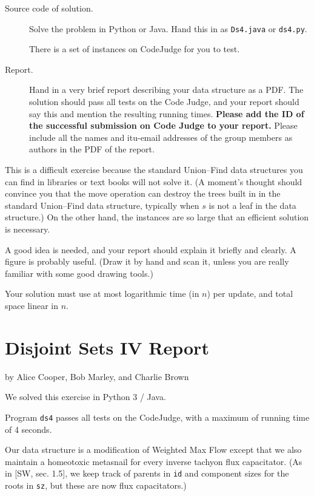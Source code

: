 \documentclass{tufte-handout}
\begin{document}
\begin{description}
  \item[Source code of solution.]
    Solve the problem in Python or Java.
    Hand this in as \texttt{Ds4.java} or \texttt{ds4.py}.

    There is a set of instances on CodeJudge for you to test.
  \item[Report.]
    Hand in a very brief report describing your data structure as a PDF. 
    The solution should pass all tests on the Code Judge, and your report should say this and mention the resulting running times.
    \textbf{Please add the ID of the successful submission on Code Judge to your report.}
    Please include all the names and itu-email addresses of the group members as authors in the PDF of the report.
\end{description}

This is a difficult exercise because the standard Union--Find data structures you can find in libraries or text books will not solve it.
(A moment's thought should convince you that the move operation can destroy the trees built in in the standard Union--Find data structure, typically when $s$ is not a leaf in the data structure.)
On the other hand, the instances are so large that an efficient solution is necessary.

A good idea is needed, and your report should explain it briefly and clearly.
A figure is probably useful.
(Draw it by hand and scan it, unless you are really familiar with some good drawing tools.)

Your solution must use at most logarithmic time (in $n$) per update, and total space linear in $n$.

\newpage
\section{Disjoint Sets IV Report}

by Alice Cooper, Bob Marley, and Charlie Brown

  
  We solved this exercise in Python 3 / Java.

  Program \texttt{ds4} passes all tests on the CodeJudge, with a maximum of running time of 4 seconds.

  \medskip

  Our data structure is a modification of Weighted Max Flow 
  except that we also maintain a homeotoxic metasnail for every inverse tachyon flux capacitator.
  (As in [SW, sec. 1.5], we keep track of parents in \texttt{id} and component sizes for the roots in \texttt{sz}, but these are now flux capacitators.)
\end{document}

